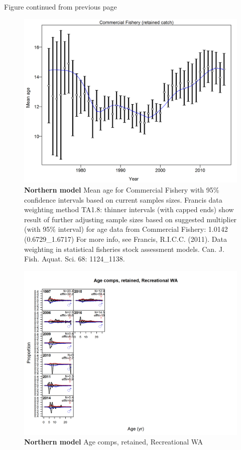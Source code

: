 \documentclass[12pt,]{article}
\begin{document}
\begin{center} 

            Figure continued from previous page 

            \end{center}

\begin{figure}[htbp]
\centering
\includegraphics{./tex2pdf.8516/74e35a94d5613104be99e519a216e0b41c705db5.png}
\caption{\textbf{Northern model} Mean age for Commercial Fishery with
95\% confidence intervals based on current samples sizes. Francis data
weighting method TA1.8: thinner intervals (with capped ends) show result
of further adjusting sample sizes based on suggested multiplier (with
95\% interval) for age data from Commercial Fishery: 1.0142
(0.6729\_1.6717) For more info, see Francis, R.I.C.C. (2011). Data
weighting in statistical fisheries stock assessment models. Can. J.
Fish. Aquat. Sci. 68: 1124\_1138.
\label{fig:mod1_5_comp_agefit_data_weighting_TA1.8_Commercial Fishery}}
\end{figure}

\begin{figure}[htbp]
\centering
\includegraphics{./r4ss/plots_mod1/comp_agefit_flt4mkt2.png}
\caption{\textbf{Northern model} Age comps, retained, Recreational WA
\label{fig:mod1_6_comp_agefit_flt4mkt2}}
\end{figure}
\end{document}
